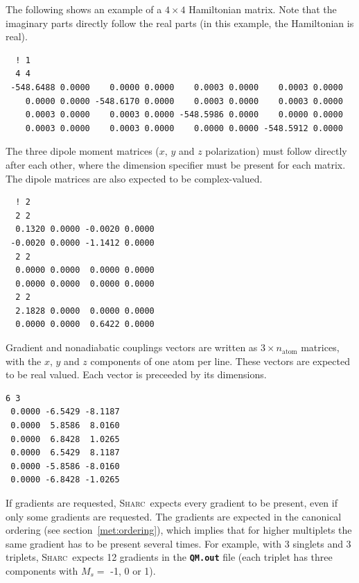 \documentclass[a4paper,10pt,DIV=15,openany]{scrbook}
\newcommand{\sharc}{\textsc{Sharc}}
\newcommand{\ttt}[1]{\textbf{\texttt{#1}}}
\newenvironment{example}{
  \setlength{\OuterFrameSep}{3pt}
  \vspace{0mm}
  \definecolor{shadecolor}{HTML}{E4F4FF}
  \begin{shaded}
}{
  \end{shaded}
}
\begin{document}
The following shows an example of a $4\times 4$ Hamiltonian matrix. Note that the imaginary parts directly follow the real parts (in this example, the Hamiltonian is real).
\begin{example}
  \begin{verbatim}
  ! 1
  4 4
 -548.6488 0.0000    0.0000 0.0000    0.0003 0.0000    0.0003 0.0000
    0.0000 0.0000 -548.6170 0.0000    0.0003 0.0000    0.0003 0.0000
    0.0003 0.0000    0.0003 0.0000 -548.5986 0.0000    0.0000 0.0000
    0.0003 0.0000    0.0003 0.0000    0.0000 0.0000 -548.5912 0.0000
\end{verbatim}
\end{example}

The three dipole moment matrices ($x$, $y$ and $z$ polarization) must follow directly after each other, where the dimension specifier must be present for each matrix. The dipole matrices are also expected to be complex-valued.
\begin{example}
  \begin{verbatim}
  ! 2
  2 2
  0.1320 0.0000 -0.0020 0.0000
 -0.0020 0.0000 -1.1412 0.0000
  2 2
  0.0000 0.0000  0.0000 0.0000
  0.0000 0.0000  0.0000 0.0000
  2 2
  2.1828 0.0000  0.0000 0.0000
  0.0000 0.0000  0.6422 0.0000
\end{verbatim}
\end{example}

Gradient and nonadiabatic couplings vectors are written as $3\times n_\text{atom}$ matrices, with the $x$, $y$ and $z$ components of one atom per line. These vectors are expected to be real valued. Each vector is preceeded by its dimensions.
\begin{example}
  \begin{verbatim}
6 3 
 0.0000 -6.5429 -8.1187
 0.0000  5.8586  8.0160
 0.0000  6.8428  1.0265
 0.0000  6.5429  8.1187
 0.0000 -5.8586 -8.0160
 0.0000 -6.8428 -1.0265
\end{verbatim}
\end{example}
If gradients are requested, \sharc\ expects every gradient to be present, even if only some gradients are requested. The gradients are expected in the canonical ordering (see section~\ref{met:ordering}), which implies that for higher multiplets the same gradient has to be present several times. For example, with 3 singlets and 3 triplets, \sharc\ expects 12 gradients in the \ttt{QM.out} file (each triplet has three components with $M_s=$ -1, 0 or 1).
\end{document}
